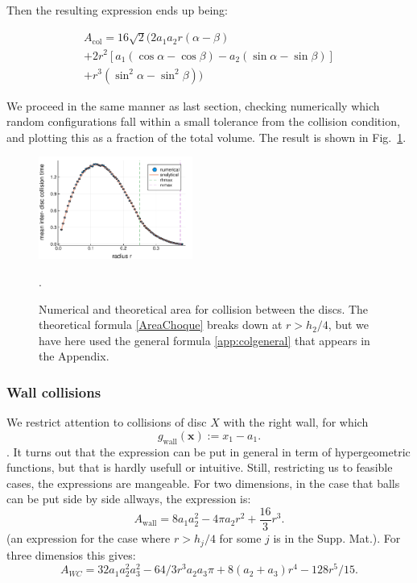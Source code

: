 \documentclass[superscriptaddress,pre,reprint,showpacs,twocolumn]{revtex4-1}
\begin{document}
Then the resulting expression ends up being:
 
\begin{equation}\label{colgeneral}
  \begin{split}
  A_\text{col}  = 16\sqrt{2} \bigl( 2a_1a_2r(\alpha-\beta)
 \\ + 2r^2 [a_1 (\cos \alpha-\cos\beta) -a_2 (\sin\alpha -\sin\beta)]
 \\ + r^3(\sin^2 \alpha -\sin^2\beta) \bigr)
  \end{split}
\end{equation}
 

We proceed in the same manner as last section, checking numerically which
random configurations
fall within a small tolerance from the collision condition, and
plotting this as a fraction of the total volume. The result is shown in Fig.~\ref{AreaChoqueTeoyNum}. 
\begin{figure}
\centering
\includegraphics[width=0.45\textwidth]{./figures/areaCol01.pdf}
\caption{Numerical and theoretical area 
for collision between the discs.  The theoretical formula 
\eqref{AreaChoque} breaks down at
$r > h_2/4$, but we have here used the general formula \eqref{app:colgeneral}
that appears in the Appendix.}
\label{AreaChoqueTeoyNum}.
\end{figure}


\subsubsection{Wall collisions}

We restrict attention to collisions of disc $X$ with the right wall, for which
$$g_\text{wall}(\mathbf{x}) := x_1 - a_1.$$.
It turns out that the expression can be put in general
in term of hypergeometric functions, but that is hardly
usefull or intuitive. Still, restricting us to
feasible cases, the expressions are mangeable. For two dimensions,
in the case that balls can be put side by side allways, the expression
is:
\begin{equation}\label{areax1p}
 A_\mathrm{wall}  = 8 a_1 a_2 ^2-4  \pi a_2 r^2 +\frac{16}{3}r^3 .
\end{equation}
(an expression for the case where $r>h_j/4$ for some $j$ is in
the Supp. Mat.).
For three dimensios this gives:
  \begin{equation}
    A_{WC}=32 a_1 a_2^2a_3^2 
    -64/3 r^3  a_2 a_3 \pi 
    +8(a_2+a_3)r^4
    -128 r^5/15.
  \end{equation}
\end{document}
